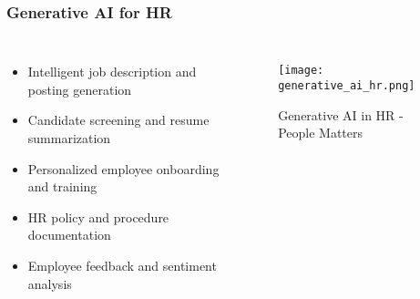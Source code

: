 \begin{frame}[fragile]\frametitle{Generative AI for HR}
\begin{columns}
\begin{itemize}
    \item Intelligent job description and posting generation
    \item Candidate screening and resume summarization
    \item Personalized employee onboarding and training
    \item HR policy and procedure documentation
    \item Employee feedback and sentiment analysis
\end{itemize}
\begin{figure}
    \texttt{[image: generative\_ai\_hr.png]}
    \caption{Generative AI in HR - People Matters}
\end{figure}
\end{columns}
\end{frame}


